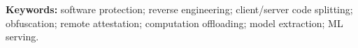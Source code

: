 \documentclass[11pt,a4paper]{article}
\begin{document}
\vspace{2pt}
\noindent\textbf{Keywords:} software protection; reverse engineering; client/server code
splitting; obfuscation; remote attestation; computation offloading; model extraction; ML
serving.












\printbibliography[heading=bibintoc]

\clearpage
\appendix

\end{document}
